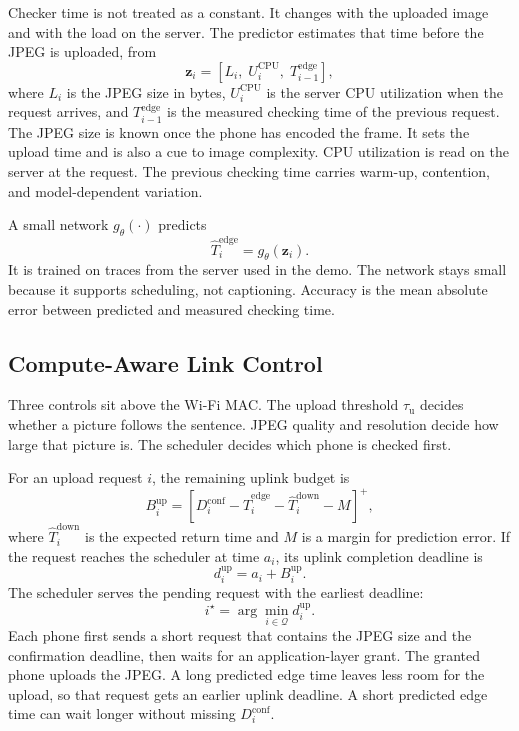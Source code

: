 Checker time is not treated as a constant. It changes with the uploaded
image and with the load on the server. The predictor estimates that time
before the JPEG is uploaded, from
\begin{equation}
\mathbf{z}_i
=
\left[
L_i,\;
U_i^{\mathrm{CPU}},\;
T_{i-1}^{\mathrm{edge}}
\right],
\end{equation}
where $L_i$ is the JPEG size in bytes, $U_i^{\mathrm{CPU}}$ is the server
CPU utilization when the request arrives, and $T_{i-1}^{\mathrm{edge}}$ is
the measured checking time of the previous request. The JPEG size is known
once the phone has encoded the frame. It sets the upload time and is also a
cue to image complexity. CPU utilization is read on the server at the
request. The previous checking time carries warm-up, contention, and
model-dependent variation.

A small network $g_\theta(\cdot)$ predicts
\begin{equation}
\hat T_i^{\mathrm{edge}}
=
g_\theta(\mathbf{z}_i).
\end{equation}
It is trained on traces from the server used in the demo. The network stays
small because it supports scheduling, not captioning. Accuracy is the mean
absolute error between predicted and measured checking time.

\subsection{Compute-Aware Link Control}

Three controls sit above the Wi-Fi MAC. The upload threshold
$\tau_{\mathrm{u}}$ decides whether a picture follows the sentence. JPEG
quality and resolution decide how large that picture is. The scheduler
decides which phone is checked first.

For an upload request $i$, the remaining uplink budget is
\begin{equation}
B_i^{\mathrm{up}}
=
\left[
D_i^{\mathrm{conf}}
-
\hat T_i^{\mathrm{edge}}
-
\hat T_i^{\mathrm{down}}
-
M
\right]^+,
\end{equation}
where $\hat T_i^{\mathrm{down}}$ is the expected return time and $M$ is a
margin for prediction error. If the request reaches the scheduler at time
$a_i$, its uplink completion deadline is
\begin{equation}
d_i^{\mathrm{up}}
=
a_i+B_i^{\mathrm{up}}.
\end{equation}
The scheduler serves the pending request with the earliest deadline:
\begin{equation}
i^\star
=
\arg\min_{i\in\mathcal{Q}}
d_i^{\mathrm{up}}.
\end{equation}
Each phone first sends a short request that contains the JPEG size and the
confirmation deadline, then waits for an application-layer grant. The
granted phone uploads the JPEG. A long predicted edge time leaves less room
for the upload, so that request gets an earlier uplink deadline. A short
predicted edge time can wait longer without missing
$D_i^{\mathrm{conf}}$.